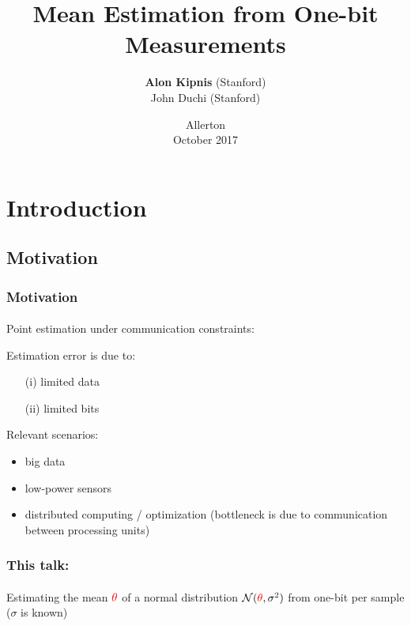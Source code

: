 \documentclass[mathserif]{beamer}
\title{Mean Estimation from One-bit Measurements}
\author{
\textbf{Alon Kipnis} (Stanford) \\
John Duchi (Stanford)\\ 
}
\date[Allerton 2017]{Allerton \\ October 2017}
\newcommand{\thetac}{{\color{red} \theta}}
\begin{document}
\graphicspath{{../Figs/}}

\frame[plain]{\titlepage}



\section{Introduction}


\subsection{Motivation}
\begin{frame}
\frametitle{Motivation}
\framesubtitle{}
Point estimation under communication constraints:\\
\begin{center}
\end{center}
Estimation error is due to:
\begin{itemize}
\item[(i)] limited data 
\item[(ii)] limited bits
\end{itemize}
\bigskip

Relevant scenarios:
\begin{itemize}
\item big data
\item low-power sensors 
\item distributed computing / optimization (bottleneck is due to communication between processing units)

\end{itemize}

\end{frame}

\begin{frame}
\frametitle{This talk: }
\framesubtitle{}
Estimating the mean $\thetac$ of a normal distribution $\mathcal N(\thetac,\sigma^2)$ from one-bit per sample ($\sigma$ is known)
\bigskip

\end{frame}
%
\end{document}
